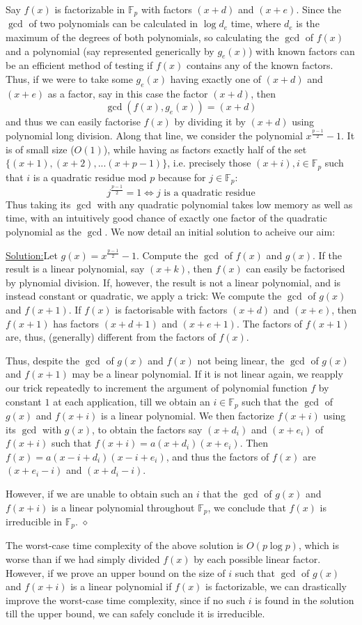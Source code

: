 \documentclass{report}
\newenvironment{aimsol}[1]{\vspace{2.5mm}\par\noindent\underline{Solution:}\space#1}{\hfill $\diamond$ \vspace{2.5mm} \par}
\begin{document}
Say $f(x)$ is factorizable in $\mathbb{F}_p$ with factors $(x+d)$ and $(x+e)$. Since the $\gcd$ of two polynomials can be calculated in $\log d_e$ time, where $d_e$ is the maximum of the degrees of both polynomials, so calculating the $\gcd$ of $f(x)$ and a polynomial (say represented generically by $g_e(x)$) with known factors can be an efficient method of testing if $f(x)$ contains any of the known factors. Thus, if we were to take some $g_e(x)$ having exactly one of $(x+d)$ and $(x+e)$ as a factor, say in this case the factor $(x+d)$, then
\[\gcd(f(x),g_e(x))=(x+d)\]
and thus we can easily factorise $f(x)$ by dividing it by $(x+d)$ using polynomial long division. Along that line, we consider the polynomial $x^{\frac{p-1}{2}}-1$. It is of small size ($O(1)$), while having as factors exactly half of the set $\{(x+1),(x+2),...(x+p-1)\}$, i.e. precisely those $(x+i), i\in \mathbb{F}_p$ such that $i$ is a quadratic residue mod $p$ because for $j\in\mathbb{F}_p$:
$$j^{\frac{p-1}{2}}=1 \Leftrightarrow j\text{ is a quadratic residue}$$
Thus taking its $\gcd$ with any quadratic polynomial takes low memory as well as time, with an intuitively good chance of exactly one factor of the quadratic polynomial as the $\gcd$. We now detail an initial solution to acheive our aim:
\begin{aimsol}
Let $g(x)=x^{\frac{p-1}{2}}-1$. Compute the $\gcd$ of $f(x)$ and $g(x)$. If the result is a linear polynomial, say $(x+k)$, then $f(x)$ can easily be factorised by plynomial division. If, however, the result is not a linear polynomial, and is instead constant or quadratic, we apply a trick: We compute the $\gcd$ of $g(x)$ and $f(x+1)$. If $f(x)$ is factorisable with factors $(x+d)$ and $(x+e)$, then $f(x+1)$ has factors $(x+d+1)$ and $(x+e+1)$. The factors of $f(x+1)$ are, thus, (generally) different from the factors of $f(x)$.

Thus, despite the $\gcd$ of $g(x)$ and $f(x)$ not being linear, the $\gcd$ of $g(x)$ and $f(x+1)$ may be a linear polynomial. If it is not linear again, we reapply our trick repeatedly to increment the argument of polynomial function $f$ by constant $1$ at each application, till we obtain an $i\in\mathbb{F}_p$ such that the $\gcd$ of $g(x)$ and $f(x+i)$ is a linear polynomial. We then factorize $f(x+i)$ using its $\gcd$ with $g(x)$, to obtain the factors say $(x+d_i)$ and $(x+e_i)$ of $f(x+i)$ such that $f(x+i)=a(x+d_i)(x+e_i)$. Then $f(x)=a(x-i+d_i)(x-i+e_i)$, and thus the factors of $f(x)$ are $(x+e_i-i)$ and $(x+d_i-i)$.

However, if we are unable to obtain such an $i$ that the $\gcd$ of $g(x)$ and $f(x+i)$ is a linear polynomial throughout $\mathbb{F}_p$, we conclude that $f(x)$ is irreducible in $\mathbb{F}_p$.
\end{aimsol}
%
The worst-case time complexity of the above solution is $O(p\log p)$, which is worse than if we had simply divided $f(x)$ by each possible linear factor. However, if we prove an upper bound on the size of $i$ such that $\gcd$ of $g(x)$ and $f(x+i)$ is a linear polynomial if $f(x)$ is factorizable, we can drastically improve the worst-case time complexity, since if no such $i$ is found in the solution till the upper bound, we can safely conclude it is irreducible.
\end{document}

